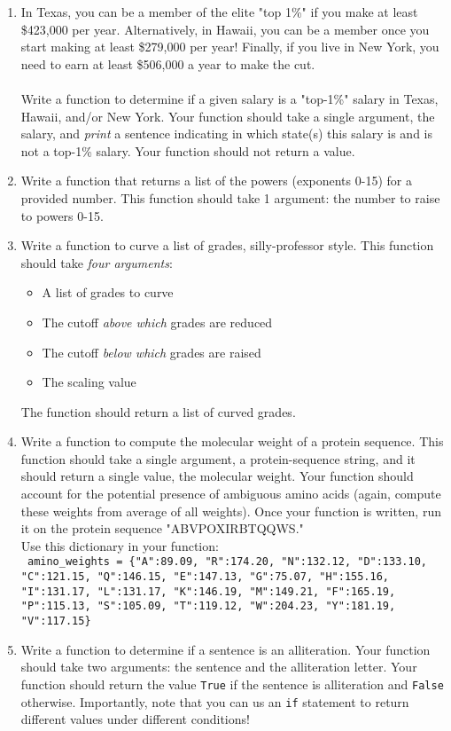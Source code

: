 \documentclass{article}[12pt]
\newcommand{\code}[1]{\texttt{#1}}  %
\begin{document}
\begin{enumerate}[itemsep=5ex]

	\item In Texas, you can be a member of the elite "top 1\%" if you make at least \$423,000 per year. Alternatively, in Hawaii, you can be a member once you start making at least \$279,000 per year! Finally, if you live in New York, you need to earn at least \$506,000 a year to make the cut. \\\\ Write a function to determine if a given salary is a "top-1\%" salary in Texas, Hawaii, and/or New York. Your function should take a single argument, the salary, and \emph{print} a sentence indicating in which state(s) this salary is and is not a top-1\% salary. Your function should not return a value.
	
	
	\item Write a function that returns a list of the powers (exponents 0-15) for a provided number. This function should take 1 argument: the number to raise to powers 0-15.
	
	\item Write a function to curve a list of grades, silly-professor style. This function should take \emph{four arguments}:
	\begin{itemize}
		\item A list of grades to curve
		\item The cutoff \emph{above which} grades are reduced
		\item The cutoff \emph{below which} grades are raised
		\item The scaling value
	\end{itemize}
	The function should return a list of curved grades.
	
	\item Write a function to compute the molecular weight of a protein sequence. This function should take a single argument, a protein-sequence string, and it should return a single value, the molecular weight. Your function should account for the potential presence of ambiguous amino acids (again, compute these weights from average of all weights). Once your function is written, run it on the protein sequence "ABVPOXIRBTQQWS." \\ Use this dictionary in your function:
	\\ \code{ amino\_weights = \{"A":89.09, "R":174.20, "N":132.12, "D":133.10, "C":121.15, "Q":146.15, "E":147.13, "G":75.07, "H":155.16, "I":131.17, "L":131.17, "K":146.19, "M":149.21, "F":165.19, "P":115.13, "S":105.09, "T":119.12, "W":204.23, "Y":181.19, "V":117.15\}} 
	
	\item Write a function to determine if a sentence is an alliteration. Your function should take two arguments: the sentence and the alliteration letter. Your function should return the value \code{True} if the sentence is alliteration and \code{False} otherwise. Importantly, note that you can us an \code{if} statement to return different values under different conditions!
		
\end{enumerate}






\end{document}
